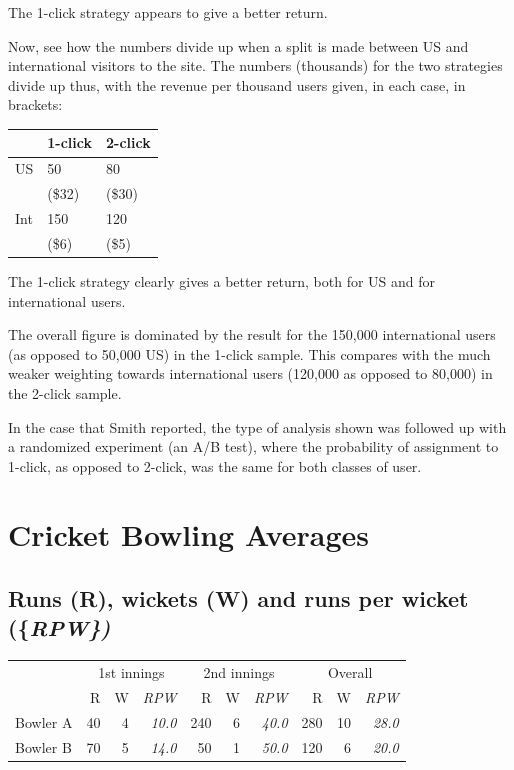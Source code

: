 \documentclass[
  10pt,
  b5paper]{book}
\begin{document}
The 1-click strategy appears to give a better return.

Now, see how the numbers divide up when a split is made between US and international visitors to the site. The numbers (thousands) for the two strategies divide up thus, with the revenue per thousand users given, in each case, in brackets:

\begin{longtable}[]{@{}lll@{}}
\toprule\noalign{}
& 1-click & 2-click \\
\midrule\noalign{}
\endhead
\bottomrule\noalign{}
\endlastfoot
US & 50 & 80 \\
& (\$32) & (\$30) \\
Int & 150 & 120 \\
& (\$6) & (\$5) \\
\end{longtable}

The 1-click strategy clearly gives a better return, both for US and for international users.

The overall figure is dominated by the result for the 150,000 international users (as opposed to 50,000 US) in the 1-click sample. This compares with the much weaker weighting towards international users (120,000 as opposed to 80,000) in the 2-click sample.

In the case that Smith reported, the type of analysis shown was followed up with a randomized experiment (an A/B test), where the probability of assignment to 1-click, as opposed to 2-click, was the same for both classes of user.

\hypertarget{cricket-bowling-averages}{%
\section{Cricket Bowling Averages}\label{cricket-bowling-averages}}

\hypertarget{runs-r-wickets-w-and-runs-per-wicket}{%
\subsection*{\texorpdfstring{Runs (R), wickets (W) and runs per wicket (\{\em RPW\})}{Runs (R), wickets (W) and runs per wicket (\{\})}}\label{runs-r-wickets-w-and-runs-per-wicket}}

\vspace*{-8pt}

\begin{center}
\begin{tabular}{lrrr||rrr||rrr}
\hline
 & \multicolumn{3}{c}{1st innings} & \multicolumn{3}{c}{2nd innings} &
\multicolumn{3}{c}{Overall} \\
\cline{2-4} \cline{5-7} \cline{8-10}
& R & W & {\em RPW}   & R & W & {\em RPW} & R & W
& {\em RPW}\\
Bowler A & 40 & 4 & {\em 10.0} & 240 & 6 & {\em 40.0} & 280 & 10 &
{\em 28.0}\\
Bowler B & 70 & 5 & {\em 14.0} & 50 & 1 & {\em 50.0} & 120 & 6 & {\em 20.0} \\
\hline
\end{tabular}
\end{center}
\end{document}
